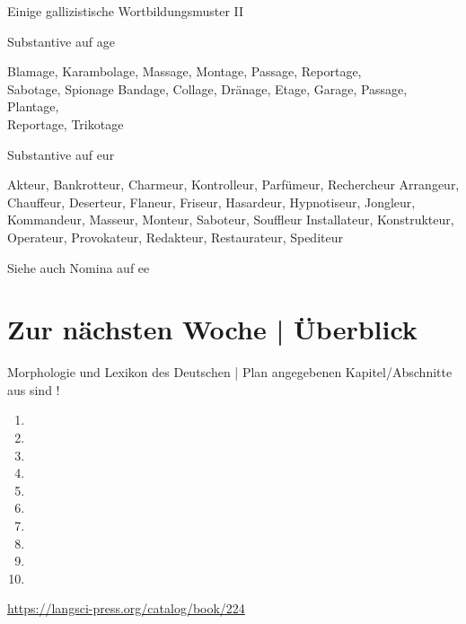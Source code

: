 \begin{frame}
  {Einige gallizistische Wortbildungsmuster II}
  \onslide<+->
  \onslide<+->
  \begin{exe}
    \ex \alert{Substantive auf age}
    \begin{xlist}
      \ex \small Blamage, Karambolage, Massage, Montage, Passage, Reportage,\\
      Sabotage, Spionage
      \ex \small Bandage, Collage, Dränage, Etage, Garage, Passage, Plantage,\\
      Reportage, Trikotage
    \end{xlist}
    \onslide<+->
    \ex \alert{Substantive auf eur}
    \begin{xlist}
      \ex \small Akteur, Bankrotteur, Charmeur, Kontrolleur, Parfümeur, Rechercheur
      \ex \small Arrangeur, Chauffeur, Deserteur, Flaneur, Friseur, Hasardeur, Hypnotiseur, Jongleur, Kommandeur, Masseur, Monteur, Saboteur, Souffleur
      \ex \small Installateur, Konstrukteur, Operateur, Provokateur, Redakteur, Restaurateur, Spediteur
    \end{xlist}
  \end{exe}
  \onslide<+->
  \Viertelzeile
  Siehe auch Nomina auf \alert{ee}
\end{frame}

\section{Zur nächsten Woche | Überblick}

\begin{frame}
  {Morphologie und Lexikon des Deutschen | Plan}
   angegebenen Kapitel\slash Abschnitte aus  sind !\\
  \Halbzeile
  \begin{enumerate}
    \item {}
    \item {}
    \item {}
    \item {}
    \item {}
    \item {}
    \item {}
    \item {}
    \item {}
    \item {}
  \end{enumerate}
  \Halbzeile
  \centering 
  \url{https://langsci-press.org/catalog/book/224}
\end{frame}



